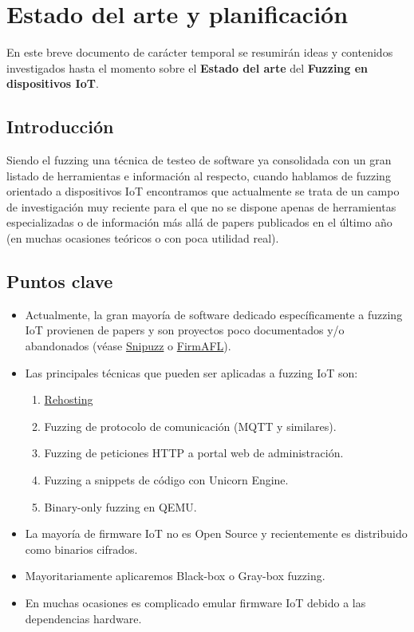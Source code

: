 \documentclass[11pt, a4paper, openany]{report}
\begin{document}
	\chapter{Estado del arte y planificación}

    En este breve documento de carácter temporal se resumirán ideas y contenidos investigados 
    hasta el momento sobre el \textbf{Estado del arte} del \textbf{Fuzzing en dispositivos IoT}.

    \section{Introducción}
    Siendo el fuzzing una técnica de testeo de software ya consolidada con un gran listado de herramientas e información
    al respecto, cuando hablamos de fuzzing orientado a dispositivos IoT encontramos que actualmente se trata de
    un campo de investigación muy reciente para el que no se dispone apenas de herramientas especializadas o de
    información más allá de papers publicados en el último año (en muchas ocasiones teóricos o con poca utilidad real).

    \section{Puntos clave}
    \begin{itemize}
        \item Actualmente, la gran mayoría de software dedicado específicamente a fuzzing IoT 
        provienen de papers y son proyectos poco documentados y/o abandonados
        (véase \href{https://github.com/XtEsco/Snipuzz}{Snipuzz} o \href{https://github.com/zyw-200/FirmAFL}{FirmAFL}). 
        \item Las principales técnicas que pueden ser aplicadas a fuzzing IoT son:
        \begin{enumerate}
            \item \href{https://rehosti.ng/}{Rehosting}
            \item Fuzzing de protocolo de comunicación (MQTT y similares).
            \item Fuzzing de peticiones HTTP a portal web de administración.
            \item Fuzzing a snippets de código con Unicorn Engine.
            \item Binary-only fuzzing en QEMU.
        \end{enumerate}
        \item La mayoría de firmware IoT no es Open Source y recientemente es distribuido como binarios 
        cifrados.
        \item Mayoritariamente aplicaremos Black-box o Gray-box fuzzing.
        \item En muchas ocasiones es complicado emular firmware IoT debido a las dependencias hardware.
    \end{itemize}
\end{document}
